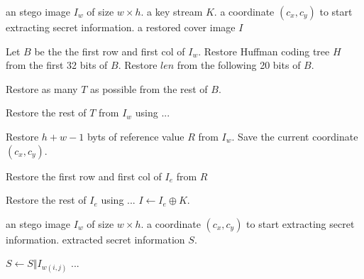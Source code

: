 \begin{algorithm}
	\caption{Data Extraction}
	
	\begin{algorithmic}[1]
		\Require an stego image $I_w$ of size $w \times h$.
		\Require a key stream $K$.
		\Ensure a coordinate $(c_x, c_y)$ to start extracting secret information.
		\Ensure a restored cover image $I$
		
		\State Let $B$ be the the first row and first col of $I_w$.
		\State Restore Huffman coding tree $H$ from the first 32 bits of $B$.
		\State Restore $len$ from the following 20 bits of $B$.
		
		\State Restore as many $T$ as possible from the rest of $B$.
		
		\State Restore the rest of $T$ from $I_w$ using ...
		
		\State Restore $h + w - 1$ byts of reference value $R$ from $I_w$.
		\State Save the current coordinate $(c_x, c_y)$.
		
		\State Restore the first row and first col of $I_e$ from $R$
		
		\State Restore the rest of $I_e$ using ...
		\State $I \gets I_e \oplus K$.
		
	\end{algorithmic}
\end{algorithm}

\begin{algorithm}
	\caption{Data Extraction}
	
	\begin{algorithmic}[1]
		\Require an stego image $I_w$ of size $w \times h$.
		\Require a coordinate $(c_x, c_y)$ to start extracting secret information.
		\Require extracted secret information $S$.
		
		\ForAll{$\{t_{i, j} \mid t_{i, j} \in T, (i = c_x \wedge j \in [c_y, w)) \vee (i \in (c_x, h), j \in [1, w))\}$}
				\State $S \gets S \Vert I_{w(i, j)}$
			\Else
				\State ... 
			\EndIf
		\EndFor
		
	\end{algorithmic}
\end{algorithm}


